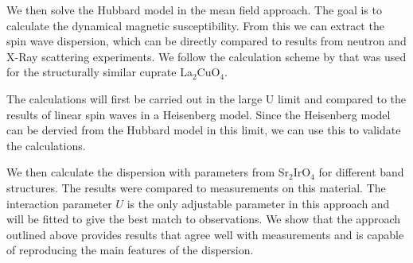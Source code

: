 We then solve the Hubbard model in the mean field approach.
The goal is to calculate the dynamical magnetic susceptibility.
From this we can extract the spin wave dispersion, which 
can be directly compared to results from neutron and X-Ray scattering experiments.
We follow the calculation scheme by  \citet{PhysRevB.65.132404} that was used for the structurally similar cuprate La$_2$CuO$_4$.

The calculations will first be carried out in the large U limit and compared to the results of linear spin waves in a Heisenberg model.
Since the Heisenberg model can be dervied from the Hubbard model in this limit, we can use this to validate the calculations.

We then calculate the dispersion with parameters from Sr$_2$IrO$_4$ for different band structures.
The results were compared to measurements on this material. 
The interaction parameter $U$ is the only adjustable parameter in this approach and will be fitted to give the best match to observations.
We show that the approach outlined above provides results that agree well with measurements and is capable of reproducing the main features of the dispersion.
%


